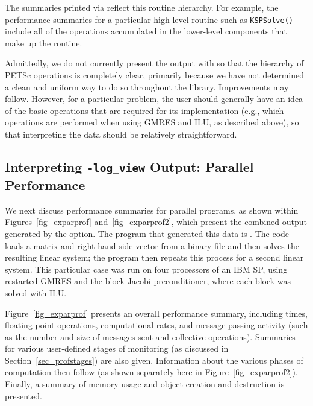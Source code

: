 The summaries printed via  reflect this
routine hierarchy. For example, the performance summaries for a
particular high-level routine such as \lstinline{KSPSolve()} include all of
the operations accumulated in the lower-level components that
make up the routine.

Admittedly, we do not currently present the output with
 so that the hierarchy of PETSc operations is completely
clear, primarily because we have not determined a clean and uniform
way to do so throughout the library.  Improvements may follow.
However, for a particular problem, the user should generally have
an idea of the basic operations that are required for its
implementation (e.g., which operations are performed when using GMRES
and ILU, as described above), so that interpreting the 
data should be relatively straightforward.

\subsection{Interpreting {\tt -log\_view} Output: Parallel Performance}
\label{sec_parperformance}

We next discuss performance summaries for parallel programs,
 as shown within Figures~\ref{fig_exparprof}
and~\ref{fig_exparprof2}, which present the combined output generated by
the  option.  The program that generated this data is
\href{http://www.mcs.anl.gov/petsc/petsc-current/src/ksp/ksp/examples/tutorials/ex10.c.html}{}.  
The code loads a
matrix and right-hand-side vector from a binary file and then solves
the resulting linear system; the program then repeats this process for
a second linear system.  This particular case was run on four
processors of an IBM SP, using restarted GMRES and the block Jacobi
preconditioner, where each block was solved with ILU.

Figure~\ref{fig_exparprof} presents an overall performance summary,
including times, floating-point operations, computational rates, and
message-passing activity (such as the number and size of messages sent
and collective operations).  Summaries for various user-defined stages
of monitoring (as discussed in Section~\ref{sec_profstages}) are also
given. Information about the various phases of computation then follow
(as shown separately here in Figure~\ref{fig_exparprof2}).
Finally, a summary of memory usage and object creation and destruction
is presented.


